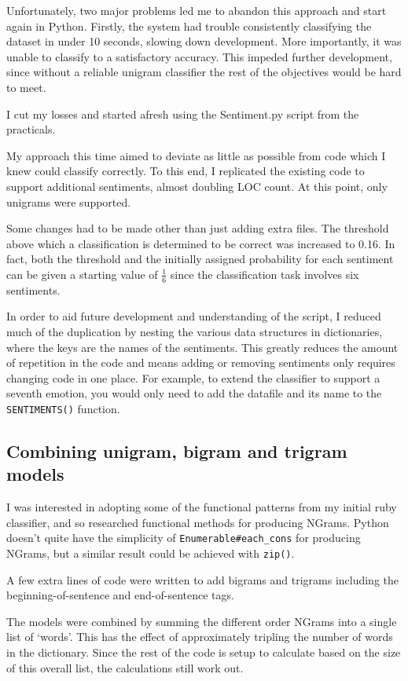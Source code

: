 \documentclass[a4paper,oneside]{article}
\begin{document}
Unfortunately, two major problems led me to abandon this approach and start
again in Python. Firstly, the system had trouble consistently classifying the
dataset in under 10 seconds, slowing down development. More importantly, it was
unable to classify to a satisfactory accuracy. This impeded further
development, since without a reliable unigram classifier the rest of the
objectives would be hard to meet.

I cut my losses and started afresh using the Sentiment.py script from the
practicals.

My approach this time aimed to deviate as little as possible from code which I
knew could classify correctly. To this end, I replicated the existing code to
support additional sentiments, almost doubling LOC count. At this point, only
unigrams were supported.

Some changes had to be made other than just adding extra files. The threshold
above which a classification is determined to be correct was increased to 0.16.
In fact, both the threshold and the initially assigned probability for each
sentiment can be given a starting value of $\frac{1}{6}$ since the
classification task involves six sentiments.

In order to aid future development and understanding of the script, I reduced
much of the duplication by nesting the various data structures in dictionaries,
where the keys are the names of the sentiments. This greatly reduces the amount
of repetition in the code and means adding or removing sentiments only requires
changing code in one place. For example, to extend the classifier to support a
seventh emotion, you would only need to add the datafile and its name to the
\verb!SENTIMENTS()! function.

\subsection{Combining unigram, bigram and trigram models}

I was interested in adopting some of the functional patterns from my initial
ruby classifier, and so researched functional methods for producing NGrams.
Python doesn't quite have the simplicity of \verb!Enumerable#each_cons! for
producing NGrams, but a similar result could be achieved with \verb!zip()!.

A few extra lines of code were written to add bigrams and trigrams including
the beginning-of-sentence and end-of-sentence tags.

The models were combined by summing the different order NGrams into a single
list of `words'. This has the effect of approximately tripling the number of
words in the dictionary. Since the rest of the code is setup to calculate based
on the size of this overall list, the calculations still work out.
\end{document}

